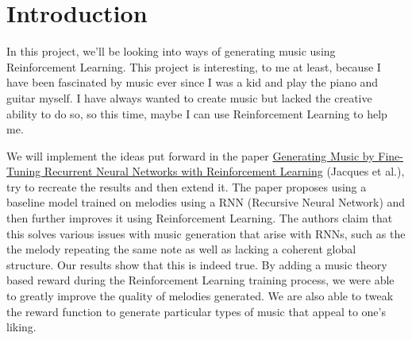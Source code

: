 \documentclass{article}
\begin{document}
\begin{abstract}
    In this project, we’ll be looking into way of generating music using Reinforcement Learning.
    Music creation is an art with infinite possibilities for showcasing one’s creativity.
    However, there are certain rules and preferences that must be obeyed to appeal to one’s liking.
    This makes it an ideal candidate for Reinforcement Learning.
    We try to recreate and extend the ideas put forward in the paper \href{https://static.googleusercontent.com/media/research.google.com/en//pubs/archive/45871.pdf}{Generating Music by Fine-Tuning Recurrent Neural Networks with Reinforcement Learning} (Jacques et al.).
    For anyone who struggles to produce an original piece of amazing music, such as myself, this project can come to the rescue.
    
\end{abstract}

\section{Introduction}

In this project, we’ll be looking into ways of generating music using Reinforcement Learning.
This project is interesting, to me at least, because I have been fascinated by music ever since I was a kid and play the piano and guitar myself.
I have always wanted to create music but lacked the creative ability to do so, so this time, maybe I can use Reinforcement Learning to help me.

We will implement the ideas put forward in the paper \href{https://static.googleusercontent.com/media/research.google.com/en//pubs/archive/45871.pdf}{Generating Music by Fine-Tuning Recurrent Neural Networks with Reinforcement Learning} (Jacques et al.), try to recreate the results and then extend it.
The paper proposes using a baseline model trained on melodies using a RNN (Recursive Neural Network) and then further improves it using Reinforcement Learning.
The authors claim that this solves various issues with music generation that arise with RNNs, such as the the melody repeating the same note as well as lacking
a coherent global structure. Our results show that this is indeed true. By adding a music theory based reward during the Reinforcement Learning training process,
we were able to greatly improve the quality of melodies generated. We are also able to tweak the reward function to generate particular types of music that appeal to one's liking.
\end{document}
